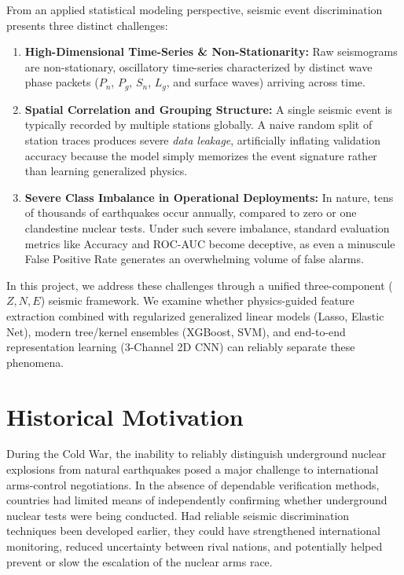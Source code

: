 \documentclass[11pt,a4paper]{article}
\begin{document}
From an applied statistical modeling perspective, seismic event discrimination presents three distinct challenges:
\begin{enumerate}
    \item \textbf{High-Dimensional Time-Series \& Non-Stationarity:} Raw seismograms are non-stationary, oscillatory time-series characterized by distinct wave phase packets ($P_n$, $P_g$, $S_n$, $L_g$, and surface waves) arriving across time.
    \item \textbf{Spatial Correlation and Grouping Structure:} A single seismic event is typically recorded by multiple stations globally. A naive random split of station traces produces severe \textit{data leakage}, artificially inflating validation accuracy because the model simply memorizes the event signature rather than learning generalized physics.
    \item \textbf{Severe Class Imbalance in Operational Deployments:} In nature, tens of thousands of earthquakes occur annually, compared to zero or one clandestine nuclear tests. Under such severe imbalance, standard evaluation metrics like Accuracy and ROC-AUC become deceptive, as even a minuscule False Positive Rate generates an overwhelming volume of false alarms.
\end{enumerate}

In this project, we address these challenges through a unified three-component ($Z, N, E$) seismic framework. We examine whether physics-guided feature extraction combined with regularized generalized linear models (Lasso, Elastic Net), modern tree/kernel ensembles (XGBoost, SVM), and end-to-end representation learning (3-Channel 2D CNN) can reliably separate these phenomena.


\section{Historical Motivation}
During the Cold War, the inability to reliably distinguish underground nuclear explosions from natural earthquakes posed a major challenge to international arms-control negotiations. In the absence of dependable verification methods, countries had limited means of independently confirming whether underground nuclear tests were being conducted. Had reliable seismic discrimination techniques been developed earlier, they could have strengthened international monitoring, reduced uncertainty between rival nations, and potentially helped prevent or slow the escalation of the nuclear arms race.
\end{document}
